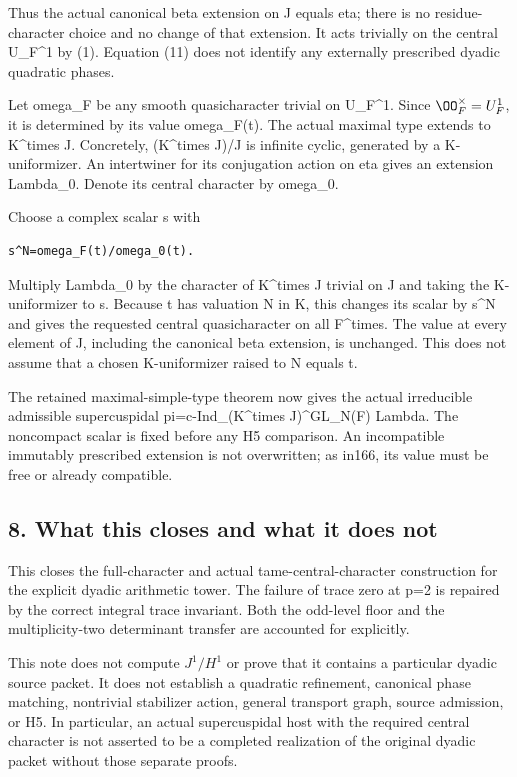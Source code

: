 Thus the actual canonical beta extension on J equals eta; there is no
residue-character choice and no change of that extension. It acts
trivially on the central U\_F\^{}1 by (1). Equation (11) does not
identify any externally prescribed dyadic quadratic phases.

Let omega\_F be any smooth quasicharacter trivial on U\_F\^{}1. Since
\(\OO_F^\times=U_F^1\), it is determined by its value
omega\_F(t). The actual maximal type extends to K\^{}times J.
Concretely, (K\^{}times J)/J is infinite cyclic, generated by a
K-uniformizer. An intertwiner for its conjugation action on eta gives an
extension Lambda\_0. Denote its central character by omega\_0.

Choose a complex scalar s with

\begin{Verbatim}[fontsize=\small,breaklines=true,breakanywhere=true]
s^N=omega_F(t)/omega_0(t).
\end{Verbatim}

Multiply Lambda\_0 by the character of K\^{}times J trivial on J and
taking the K-uniformizer to s. Because t has valuation N in K, this
changes its scalar by s\^{}N and gives the requested central
quasicharacter on all F\^{}times. The value at every element of J,
including the canonical beta extension, is unchanged. This does not
assume that a chosen K-uniformizer raised to N equals t.

The retained maximal-simple-type theorem now gives the actual
irreducible admissible supercuspidal pi=c-Ind\_(K\^{}times
J)\^{}GL\_N(F) Lambda. The noncompact scalar is fixed before any H5
comparison. An incompatible immutably prescribed extension is not
overwritten; as in166, its value must be free or already compatible.

\hypertarget{dyadic_character-what-this-closes-and-what-it-does-not}{%
\subsection{8. What this closes and what it does
not}\label{dyadic_character-what-this-closes-and-what-it-does-not}}

This closes the full-character and actual tame-central-character
construction for the explicit dyadic arithmetic tower. The failure of
trace zero at p=2 is repaired by the correct integral trace invariant.
Both the odd-level floor and the multiplicity-two determinant transfer
are accounted for explicitly.

This note does not compute \(J^1/H^1\) or prove that it
contains a particular dyadic source packet. It does not establish a
quadratic refinement, canonical phase matching, nontrivial stabilizer
action, general transport graph, source admission, or H5. In particular,
an actual supercuspidal host with the required central character is not
asserted to be a completed realization of the original dyadic packet
without those separate proofs.

